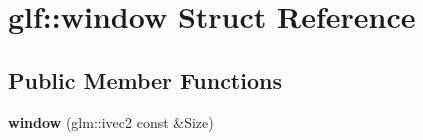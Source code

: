 \hypertarget{structglf_1_1window}{\section{glf\-:\-:window Struct Reference}
\label{structglf_1_1window}
}
\subsection*{Public Member Functions}
\begin{DoxyCompactItemize}
\item 
\hypertarget{structglf_1_1window_a4ed769f2c702a8a05c8333cb96c3f236}{{\bfseries window} (glm\-::ivec2 const \&Size)}\label{structglf_1_1window_a4ed769f2c702a8a05c8333cb96c3f236}

\end{DoxyCompactItemize}
